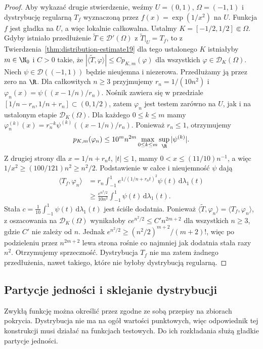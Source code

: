 \begin{proof}
Aby wykazać drugie stwierdzenie, weźmy
$U=(0,1)$, $\Omega=(-1,1)$ i dystrybucję regularną
$T_f$ wyznaczoną przez $f(x)=\exp(1/x^2)$ na $U$.
Funkcja $f$ jest gładka na $U$, a więc lokalnie
całkowalna. Ustalmy $K=[-1/2,1/2]\Subset\Omega$.
Gdyby istniało przedłużenie
$\widetilde T\in\mathcal D'(\Omega)$ z
$\widetilde T|_U=T_f$, to z
Twierdzenia~\ref{thm:distribution-estimate19}
dla tego ustalonego $K$ istniałyby $m\in\N_0$
i $C>0$ takie, że
$|\langle\widetilde T,\varphi\rangle|\le C p_{K,m}(\varphi)$
dla wszystkich $\varphi\in\mathcal D_K(\Omega)$.
Niech $\psi\in\mathcal D((-1,1))$ będzie nieujemna
i niezerowa. Przedłużamy ją przez zero na $\R$.
Dla całkowitych $n\ge3$ przyjmujemy
$r_n=1/(10n^2)$ i
$\varphi_n(x)=\psi((x-1/n)/r_n)$.
Nośnik zawiera się w przedziale
$[1/n-r_n,1/n+r_n]\subset(0,1/2)$, zatem
$\varphi_n$ jest testem zarówno na $U$, jak i na
ustalonym etapie $\mathcal D_K(\Omega)$.
Dla każdego $0\le k\le m$ mamy
$\varphi_n^{(k)}(x)=r_n^{-k}\psi^{(k)}((x-1/n)/r_n)$.
Ponieważ $r_n\le1$, otrzymujemy
\[
 p_{K,m}(\varphi_n)
 \le 10^m n^{2m}\max_{0\le k\le m}
 \sup_{\R}|\psi^{(k)}|.
\]
Z drugiej strony dla $x=1/n+r_nt$, $|t|\le1$,
mamy $0<x\le(11/10)n^{-1}$, a więc
$1/x^2\ge(100/121)n^2\ge n^2/2$.
Podstawienie w całce i nieujemność $\psi$ dają
\[
 \begin{aligned}
 \langle T_f,\varphi_n\rangle
 &=r_n\int_{-1}^1 e^{1/(1/n+r_nt)^2}\psi(t)\,
 \mathrm d\lambda_1(t)\\
 &\ge \frac{e^{n^2/2}}{10n^2}
 \int_{-1}^1\psi(t)\,\mathrm d\lambda_1(t).
 \end{aligned}
\]
Stała $c=\frac1{10}\int_{-1}^1\psi(t)\,\mathrm d\lambda_1(t)$
jest ściśle dodatnia. Ponieważ
$\langle\widetilde T,\varphi_n\rangle=
\langle T_f,\varphi_n\rangle$, z oszacowania na
$\mathcal D_K(\Omega)$ wynikałoby
$c e^{n^2/2}\le C' n^{2m+2}$ dla wszystkich $n\ge3$,
gdzie $C'$ nie zależy od $n$. Jednak
$e^{n^2/2}\ge (n^2/2)^{m+2}/(m+2)!$,
więc po podzieleniu przez $n^{2m+2}$ lewa strona
rośnie co najmniej jak dodatnia stała razy $n^2$.
Otrzymujemy sprzeczność. Dystrybucja $T_f$ nie ma zatem żadnego przedłużenia,
nawet takiego, które nie byłoby dystrybucją regularną.
\end{proof}

\subsection{Partycje jedności i sklejanie dystrybucji}

Zwykłą funkcję można określić przez zgodne ze sobą przepisy
na zbiorach pokrycia. Dystrybucja nie ma na ogół wartości
punktowych, więc odpowiednik tej konstrukcji musi działać
na funkcjach testowych. Do ich rozkładania służą gładkie
partycje jedności.

